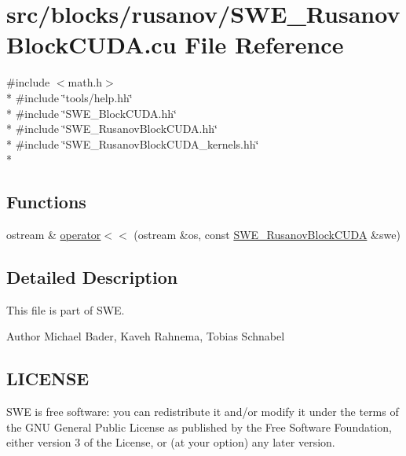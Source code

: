 \hypertarget{SWE__RusanovBlockCUDA_8cu}{\section{src/blocks/rusanov/\-S\-W\-E\-\_\-\-Rusanov\-Block\-C\-U\-D\-A.cu File Reference}
\label{SWE__RusanovBlockCUDA_8cu}
}
{\ttfamily \#include $<$math.\-h$>$}\\*
{\ttfamily \#include \char`\"{}tools/help.\-hh\char`\"{}}\\*
{\ttfamily \#include \char`\"{}S\-W\-E\-\_\-\-Block\-C\-U\-D\-A.\-hh\char`\"{}}\\*
{\ttfamily \#include \char`\"{}S\-W\-E\-\_\-\-Rusanov\-Block\-C\-U\-D\-A.\-hh\char`\"{}}\\*
{\ttfamily \#include \char`\"{}S\-W\-E\-\_\-\-Rusanov\-Block\-C\-U\-D\-A\-\_\-kernels.\-hh\char`\"{}}\\*
\subsection*{Functions}
\begin{DoxyCompactItemize}
\item 
ostream \& \hyperlink{SWE__RusanovBlockCUDA_8cu_adbdcb6417643b695657724ea16f84954}{operator$<$$<$} (ostream \&os, const \hyperlink{classSWE__RusanovBlockCUDA}{S\-W\-E\-\_\-\-Rusanov\-Block\-C\-U\-D\-A} \&swe)
\end{DoxyCompactItemize}


\subsection{Detailed Description}
This file is part of S\-W\-E.

\begin{DoxyAuthor}{Author}
Michael Bader, Kaveh Rahnema, Tobias Schnabel
\end{DoxyAuthor}
\hypertarget{Writer_8hh_LICENSE}{}\subsection{L\-I\-C\-E\-N\-S\-E}\label{Writer_8hh_LICENSE}
S\-W\-E is free software\-: you can redistribute it and/or modify it under the terms of the G\-N\-U General Public License as published by the Free Software Foundation, either version 3 of the License, or (at your option) any later version.

